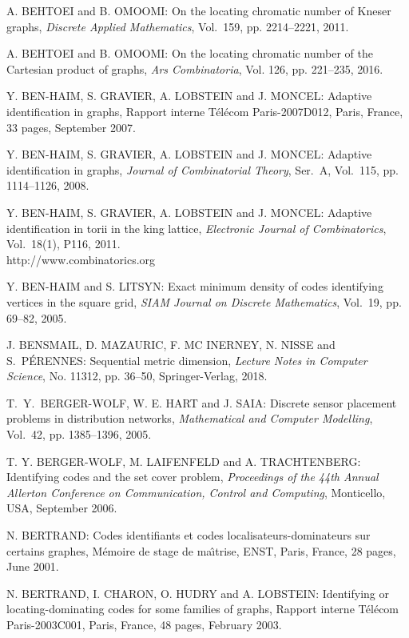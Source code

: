 \begin{thebibliography}{999}
A. BEHTOEI and B. OMOOMI: On the locating chromatic number of Kneser graphs, {\it Discrete Applied Mathematics}, Vol.~159, pp. 2214--2221, 2011. 


A. BEHTOEI and B. OMOOMI: On the locating chromatic number of the Cartesian product of graphs, {\it Ars Combinatoria}, Vol. 126, pp. 221--235, 2016.
  
Y. BEN-HAIM, S. GRAVIER, A. LOBSTEIN and J. MONCEL: Adaptive identification in graphs, Rapport interne T\'el\'ecom Paris-2007D012, Paris, France, 33 pages, September 2007.

Y. BEN-HAIM, S. GRAVIER, A. LOBSTEIN and J. MONCEL: Adaptive identification in graphs, {\it Journal of Combinatorial Theory}, Ser.~A, Vol.~115, pp. 1114--1126, 2008.

Y. BEN-HAIM, S. GRAVIER, A. LOBSTEIN and J. MONCEL: Adaptive identification in torii in the king lattice, {\it Electronic Journal of Combinatorics}, Vol.~18(1), P116, 2011.\\
http://www.combinatorics.org

Y. BEN-HAIM and S. LITSYN: Exact minimum density of codes identifying vertices in the square grid, {\it SIAM Journal on Discrete Mathematics}, Vol.~19, pp. 69--82, 2005.

J. BENSMAIL, D. MAZAURIC, F. MC INERNEY, N. NISSE and S.~P\'E\-RENNES: Sequential metric dimension, {\it Lecture Notes in Computer Science}, No. 11312, pp. 36--50, Springer-Verlag, 2018.

%
T.~Y.~BERGER-WOLF, W. E. HART and J. SAIA: Discrete sensor placement problems in distribution networks, {\it Mathematical and Computer Modelling}, Vol.~42, pp. 1385--1396, 2005.

T. Y. BERGER-WOLF, M. LAIFENFELD and A. TRACHTENBERG: Identifying codes and the set cover problem, {\it Proceedings of the 44th Annual Allerton Conference on Communication, Control and Computing}, Monticello, USA, September 2006.

N. BERTRAND: Codes identifiants et codes localisateurs-dominateurs sur certains graphes, M\'emoire de stage de ma\^{\i}trise, ENST, Paris, France, 28 pages, June 2001.

N. BERTRAND, I. CHARON, O. HUDRY and A. LOBSTEIN: Identifying or locating-dominating codes for some families of graphs, Rapport interne T\'el\'ecom Paris-2003C001, Paris, France, 48 pages, February 2003.


\end{thebibliography}
